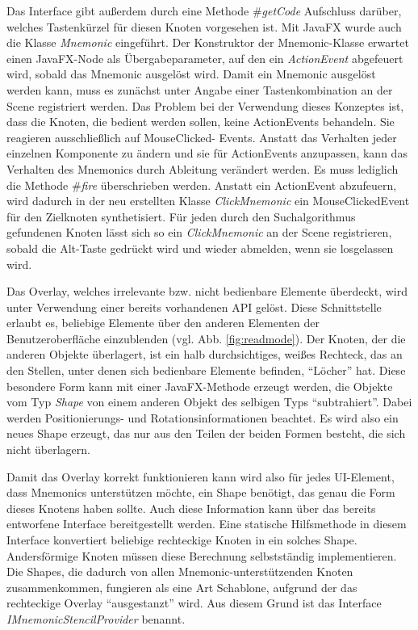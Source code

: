 Das Interface gibt außerdem durch eine Methode \textit{$\#$getCode} Aufschluss darüber, welches Tastenkürzel für diesen Knoten vorgesehen ist. Mit JavaFX wurde auch die Klasse \textit{Mnemonic} eingeführt. Der Konstruktor der Mnemonic-Klasse erwartet einen JavaFX-Node als Übergabeparameter, auf den ein \textit{ActionEvent} abgefeuert wird, sobald das Mnemonic ausgelöst wird. Damit ein Mnemonic ausgelöst werden kann, muss es zunächst unter Angabe einer Tastenkombination an der Scene registriert werden. Das Problem bei der Verwendung dieses Konzeptes ist, dass die Knoten, die bedient werden sollen, keine ActionEvents behandeln. Sie reagieren ausschließlich auf MouseClicked- Events. Anstatt das Verhalten jeder einzelnen Komponente zu ändern und sie für ActionEvents anzupassen, kann das Verhalten des Mnemonics durch Ableitung verändert werden. Es muss lediglich die Methode \textit{$\#$fire} überschrieben werden. Anstatt ein ActionEvent abzufeuern, wird dadurch in der neu erstellten Klasse \textit{ClickMnemonic} ein MouseClickedEvent für den Zielknoten synthetisiert. Für jeden durch den Suchalgorithmus gefundenen Knoten lässt sich so ein \textit{ClickMnemonic} an der Scene registrieren, sobald die Alt-Taste gedrückt wird und wieder abmelden, wenn sie losgelassen wird.\par
Das Overlay, welches irrelevante bzw. nicht bedienbare Elemente überdeckt, wird unter Verwendung einer bereits vorhandenen API gelöst. Diese Schnittstelle erlaubt es, beliebige Elemente über den anderen Elementen der Benutzeroberfläche einzublenden (vgl. Abb. \ref{fig:readmode}). Der Knoten, der die anderen Objekte überlagert, ist ein halb durchsichtiges, weißes Rechteck, das an den Stellen, unter denen sich bedienbare Elemente befinden, \enquote{Löcher} hat. Diese besondere Form kann mit einer JavaFX-Methode erzeugt werden, die Objekte vom Typ \textit{Shape} von einem anderen Objekt des selbigen Typs \enquote{subtrahiert}. Dabei werden Positionierungs- und Rotationsinformationen beachtet. Es wird also ein neues Shape erzeugt, das nur aus den Teilen der beiden Formen besteht, die sich nicht überlagern.\par
Damit das Overlay korrekt funktionieren kann wird also für jedes UI-Element, dass Mnemonics unterstützen möchte, ein Shape benötigt, das genau die Form dieses Knotens haben sollte. Auch diese Information kann über das bereits entworfene Interface bereitgestellt werden. Eine statische Hilfsmethode in diesem Interface konvertiert beliebige rechteckige Knoten in ein solches Shape. Andersförmige Knoten müssen diese Berechnung selbstständig implementieren. Die Shapes, die dadurch von allen Mnemonic-unterstützenden Knoten zusammenkommen, fungieren als eine Art Schablone, aufgrund der das rechteckige Overlay \enquote{ausgestanzt} wird. Aus diesem Grund ist das Interface \textit{IMnemonicStencilProvider} benannt.\par
